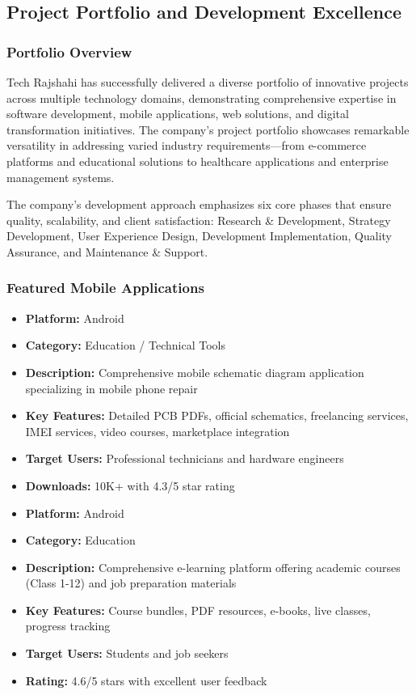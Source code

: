 \newpage
\subsection{Project Portfolio and Development Excellence}

\subsubsection{Portfolio Overview}

Tech Rajshahi has successfully delivered a diverse portfolio of innovative projects across multiple technology domains, demonstrating comprehensive expertise in software development, mobile applications, web solutions, and digital transformation initiatives. The company's project portfolio showcases remarkable versatility in addressing varied industry requirements—from e-commerce platforms and educational solutions to healthcare applications and enterprise management systems.

The company's development approach emphasizes six core phases that ensure quality, scalability, and client satisfaction: Research \& Development, Strategy Development, User Experience Design, Development Implementation, Quality Assurance, and Maintenance \& Support.

\subsubsection{Featured Mobile Applications}

\begin{itemize}
    \item \textbf{Platform:} Android
    \item \textbf{Category:} Education / Technical Tools
    \item \textbf{Description:} Comprehensive mobile schematic diagram application specializing in mobile phone repair
    \item \textbf{Key Features:} Detailed PCB PDFs, official schematics, freelancing services, IMEI services, video courses, marketplace integration
    \item \textbf{Target Users:} Professional technicians and hardware engineers
    \item \textbf{Downloads:} 10K+ with 4.3/5 star rating
\end{itemize}

\begin{itemize}
    \item \textbf{Platform:} Android  
    \item \textbf{Category:} Education
    \item \textbf{Description:} Comprehensive e-learning platform offering academic courses (Class 1-12) and job preparation materials
    \item \textbf{Key Features:} Course bundles, PDF resources, e-books, live classes, progress tracking
    \item \textbf{Target Users:} Students and job seekers
    \item \textbf{Rating:} 4.6/5 stars with excellent user feedback
\end{itemize}

